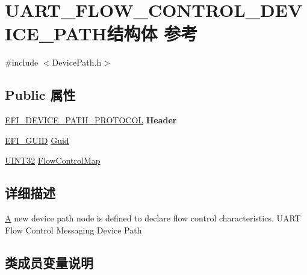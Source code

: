 \hypertarget{struct_u_a_r_t___f_l_o_w___c_o_n_t_r_o_l___d_e_v_i_c_e___p_a_t_h}{}\section{U\+A\+R\+T\+\_\+\+F\+L\+O\+W\+\_\+\+C\+O\+N\+T\+R\+O\+L\+\_\+\+D\+E\+V\+I\+C\+E\+\_\+\+P\+A\+T\+H结构体 参考}
\label{struct_u_a_r_t___f_l_o_w___c_o_n_t_r_o_l___d_e_v_i_c_e___p_a_t_h}


{\ttfamily \#include $<$Device\+Path.\+h$>$}

\subsection*{Public 属性}
\begin{DoxyCompactItemize}
\item 
\mbox{\label{struct_u_a_r_t___f_l_o_w___c_o_n_t_r_o_l___d_e_v_i_c_e___p_a_t_h_a15a955b441fc0334737e036d91f54aa3}} 
\hyperlink{struct_e_f_i___d_e_v_i_c_e___p_a_t_h___p_r_o_t_o_c_o_l}{E\+F\+I\+\_\+\+D\+E\+V\+I\+C\+E\+\_\+\+P\+A\+T\+H\+\_\+\+P\+R\+O\+T\+O\+C\+OL} {\bfseries Header}
\item 
\hyperlink{_uefi_base_type_8h_ad87614428813f71edb2c2d802e9ce2af}{E\+F\+I\+\_\+\+G\+U\+ID} \hyperlink{struct_u_a_r_t___f_l_o_w___c_o_n_t_r_o_l___d_e_v_i_c_e___p_a_t_h_afb5b8ceb84e7179c35cc94f711751198}{Guid}
\item 
\hyperlink{_processor_bind_8h_ae1e6edbbc26d6fbc71a90190d0266018}{U\+I\+N\+T32} \hyperlink{struct_u_a_r_t___f_l_o_w___c_o_n_t_r_o_l___d_e_v_i_c_e___p_a_t_h_a4f33c5600882e5182f145eaa8e5657b7}{Flow\+Control\+Map}
\end{DoxyCompactItemize}


\subsection{详细描述}
\hyperlink{struct_a}{A} new device path node is defined to declare flow control characteristics. U\+A\+RT Flow Control Messaging Device Path 

\subsection{类成员变量说明}
\mbox{\label{struct_u_a_r_t___f_l_o_w___c_o_n_t_r_o_l___d_e_v_i_c_e___p_a_t_h_a4f33c5600882e5182f145eaa8e5657b7}} 
